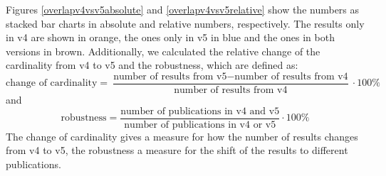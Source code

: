 \documentclass{article}
\begin{document}
Figures \ref{overlapv4vsv5absolute} and \ref{overlapv4vsv5relative} show the numbers as stacked bar charts in absolute and relative numbers, respectively. The results only in v4 are shown in orange, the ones only in v5 in blue and the ones in both versions in brown.
Additionally, we calculated the relative change of the cardinality from v4 to v5 and the robustness, which are defined as:
\begin{equation*}
    \text{change of cardinality} = \frac{\text{number of results from v5}-\text{number of results from v4}}{\text{number of results from v4}}\cdot100\%
\end{equation*}
and
\begin{equation*}
    \text{robustness} = \frac{\text{number of publications in v4 and v5}}{\text{number of publications in v4 or v5}}\cdot100\%
\end{equation*}
The change of cardinality gives a measure for how the number of results changes from v4 to v5, the robustness a measure for the shift of the results to different publications.
\end{document}

